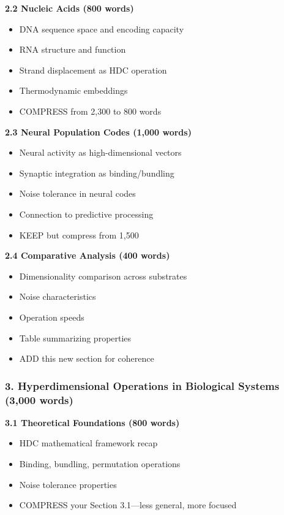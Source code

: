\documentclass[11pt]{article}
\begin{document}
\textbf{2.2 Nucleic Acids (800 words)}
\begin{itemize}
    \item DNA sequence space and encoding capacity
    \item RNA structure and function
    \item Strand displacement as HDC operation
    \item Thermodynamic embeddings
    \item \textcolor{compress}{COMPRESS from 2,300 to 800 words}
\end{itemize}

\textbf{2.3 Neural Population Codes (1,000 words)}
\begin{itemize}
    \item Neural activity as high-dimensional vectors
    \item Synaptic integration as binding/bundling
    \item Noise tolerance in neural codes
    \item Connection to predictive processing
    \item \textcolor{keep}{KEEP but compress from 1,500}
\end{itemize}

\textbf{2.4 Comparative Analysis (400 words)}
\begin{itemize}
    \item Dimensionality comparison across substrates
    \item Noise characteristics
    \item Operation speeds
    \item Table summarizing properties
    \item \textcolor{keep}{ADD this new section for coherence}
\end{itemize}

\subsubsection{3. Hyperdimensional Operations in Biological Systems (3,000 words)}

\textbf{3.1 Theoretical Foundations (800 words)}
\begin{itemize}
    \item HDC mathematical framework recap
    \item Binding, bundling, permutation operations
    \item Noise tolerance properties
    \item \textcolor{compress}{COMPRESS your Section 3.1—less general, more focused}
\end{itemize}
\end{document}

